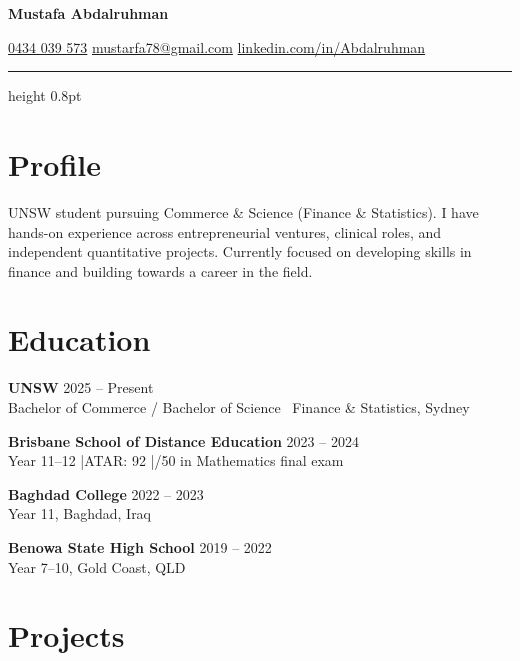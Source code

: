 \documentclass[11pt, a4paper]{article}
\begin{document}
{\fontsize{26pt}{28pt}\selectfont\bfseries Mustafa Abdalruhman}

\vspace{5pt}
{\small\color{muted}
  \faPhone\enspace \href{tel:+61434039573}{0434 039 573}
  \quad\textbar\quad
  \faEnvelope\enspace \href{mailto:mustarfa78@gmail.com}{mustarfa78@gmail.com}
  \quad\textbar\quad
  \faLinkedin\enspace \href{https://www.linkedin.com/in/Abdalruhman}{linkedin.com/in/Abdalruhman}
}

\vspace{4pt}
\textcolor{rule}{\hrule height 0.8pt}
\vspace{10pt}

\section{Profile}

UNSW student pursuing Commerce \& Science (Finance \& Statistics). I have hands-on experience across entrepreneurial ventures, clinical roles, and independent quantitative projects. Currently focused on developing skills in finance and building towards a career in the field.

\section{Education}

\textbf{UNSW} \hfill \textcolor{muted}{\small 2025 -- Present}\\
Bachelor of Commerce / Bachelor of Science \textemdash\ Finance \& Statistics, Sydney

\medskip
\textbf{Brisbane School of Distance Education} \hfill \textcolor{muted}{\small 2023 -- 2024}\\
Year 11--12 \quad|\quad ATAR: 92 \quad|/50 in Mathematics final exam

\medskip
\textbf{Baghdad College} \hfill \textcolor{muted}{\small 2022 -- 2023}\\
Year 11, Baghdad, Iraq

\medskip
\textbf{Benowa State High School} \hfill \textcolor{muted}{\small 2019 -- 2022}\\
Year 7--10, Gold Coast, QLD

\section{Projects}
\end{document}
